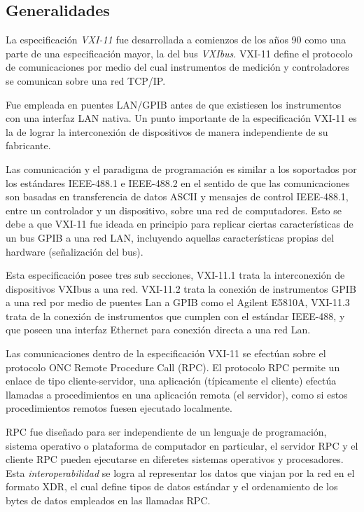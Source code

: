 \documentclass[paper=letter,oneside,fontsize=11pt, parskip=full]{scrartcl}
\begin{document}
		\subsection{Generalidades}		

		La especificación \emph{VXI-11} fue desarrollada a comienzos de los años 90 como una parte de una especificación mayor, la del bus \emph{VXIbus}. VXI-11 define el protocolo de comunicaciones por medio del cual instrumentos de medición y controladores se comunican sobre una red TCP/IP. 
		
		Fue empleada en puentes LAN/GPIB antes de que existiesen los instrumentos con una interfaz LAN nativa. 	Un punto importante de la especificación VXI-11 es la de lograr la interconexión de dispositivos de manera independiente de su fabricante.			
		
		Las comunicación y el paradigma de  programación es similar a los soportados por los estándares IEEE-488.1 e IEEE-488.2 en el sentido de que las comunicaciones son basadas en transferencia de datos ASCII y mensajes de control IEEE-488.1, entre un controlador y un dispositivo, sobre una red de computadores. Esto se debe a que	VXI-11 fue ideada en principio para replicar ciertas características de un bus GPIB a una red LAN, incluyendo aquellas características propias del hardware (señalización del bus). 
				
		Esta especificación posee tres sub secciones, VXI-11.1 trata la interconexión de dispositivos VXIbus a una red. VXI-11.2 trata la conexión de instrumentos GPIB a una red por medio de puentes Lan a GPIB como el Agilent E5810A, VXI-11.3 trata de la conexión de instrumentos que cumplen con el estándar IEEE-488, y que poseen una interfaz Ethernet para conexión directa a una red Lan.
		
		Las comunicaciones dentro de la especificación VXI-11 se efectúan sobre el protocolo ONC Remote Procedure Call (RPC). El protocolo  RPC permite un enlace de tipo cliente-servidor, una aplicación (típicamente el cliente) efectúa llamadas a procedimientos en una aplicación remota (el servidor), como si estos procedimientos remotos fuesen ejecutado localmente. 
		
		RPC fue diseñado para ser independiente de un lenguaje de programación, sistema operativo o plataforma de computador en particular, el servidor RPC y el cliente RPC pueden ejecutarse en diferetes sistemas operativos y procesadores.  Esta \emph{interoperabilidad} se logra al representar los datos que viajan por la red en el formato XDR, el cual define tipos de datos estándar y el ordenamiento de los bytes de datos empleados en las llamadas RPC. 
		
\end{document}
